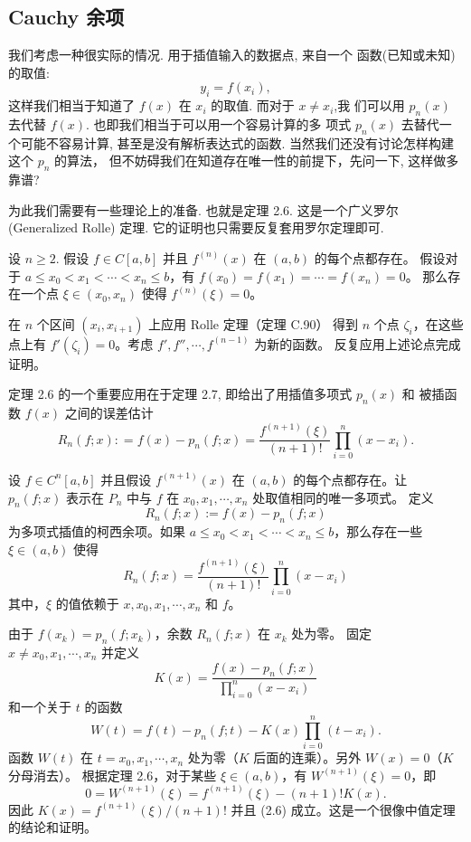 \documentclass[a4paper]{ctexart}
\newcommand{\remark}[1]
{\noindent {\bf Remark {#1}}}
\begin{document}
\subsection{Cauchy 余项}
\remark{2.4} 我们考虑一种很实际的情况. 用于插值输入的数据点, 来自一个
函数(已知或未知)的取值:
$$
y_i = f(x_i),
$$
这样我们相当于知道了 $f(x)$ 在 $x_i$ 的取值. 而对于 $x \neq x_i$,我
们可以用 $p_n(x)$ 去代替 $f(x)$. 也即我们相当于可以用一个容易计算的多
项式 $p_n(x)$ 去替代一个可能不容易计算, 甚至是没有解析表达式的函数. 
当然我们还没有讨论怎样构建这个 $p_n$ 的算法，
但不妨碍我们在知道存在唯一性的前提下，先问一下, 这样做多靠谱?

为此我们需要有一些理论上的准备. 也就是定理 2.6. 这是一个广义罗尔
(Generalized Rolle) 定理. 它的证明也只需要反复套用罗尔定理即可.

 设 $n \geq 2$. 
假设 $f \in C [a, b]$ 并且 $f^{(n)} (x)$ 在 $(a, b)$ 的每个点都存在。
假设对于 $a \leq x_0 < x_1 < \cdots < x_n \leq b$，有 $f (x_0) = f (x_1 ) = \cdots = f (x_n ) = 0$。
那么存在一个点 $\xi \in (x_0, x_n )$ 使得 $f^{(n)} (\xi) = 0$。

 在 $n$ 个区间 $(x_i , x_{i+1} )$ 上应用 Rolle 定理（定理 C.90）
得到 $n$ 个点 $\zeta_i$，在这些点上有 $f' (\zeta_i ) = 0$。考虑 $f' , f'' , \cdots , f^{(n-1)}$ 为新的函数。
反复应用上述论点完成证明。

定理 2.6 的一个重要应用在于定理 2.7, 即给出了用插值多项式 $p_n(x)$ 和
被插函数 $f(x)$ 之间的误差估计
$$
R_n(f; x) : = f(x) - p_n(f; x)
= \frac{f^{(n + 1)}(\xi)}{(n + 1)!} \prod_{i = 0}^n (x - x_i).
$$

 设 $f \in C^{n} [a, b]$ 并且假设 $f^{(n+1)} (x)$ 
在 $(a, b)$ 的每个点都存在。让 $p_n (f ; x)$ 表示在 $P_n$ 中与 $f$ 在 $x_0 , x_1 , \cdots , x_n$ 处取值相同的唯一多项式。
定义
\[
R_n (f ; x) := f (x) - p_n(f ; x) \tag{2.5}
\]
为多项式插值的柯西余项。如果 $a \leq x_0 < x_1 < \cdots < x_n \leq b$，那么存在一些 $\xi \in (a, b)$ 使得
\[
R_n (f ; x) = \frac{f^{(n+1)}(\xi)}{(n + 1)!} \prod_{i=0}^{n} (x - x_i) \tag{2.6}
\]
其中，$\xi$ 的值依赖于 $x, x_0 , x_1 , \cdots , x_n$ 和 $f$。

 由于 $f (x_k ) = p_n (f ; x_k )$，余数 $R_n (f ; x)$ 在 $x_k$ 处为零。
固定 $x \neq x_0, x_1 , \cdots , x_n$ 并定义
\[
K(x) = \frac{f (x) - p_n (f ; x)}{\prod_{i=0}^{n} (x - x_i)}
\]
和一个关于 $t$ 的函数
\[
W (t) = f (t) - p_n (f ; t) - K(x) \prod_{i=0}^{n} (t - x_i).
\]
函数 $W (t)$ 在 $t = x_0, x_1, \cdots , x_n$ 处为零（$K$ 后面的连乘）。另外 $W (x) = 0$（$K$ 分母消去）。
根据定理 2.6，对于某些 $\xi \in (a, b)$，有 $W^{(n+1)} (\xi) = 0$，即
\[
0 = W^{(n+1)} (\xi) = f^{(n+1)}(\xi) - (n + 1)!K(x).
\]
因此 $K(x) = f^{(n+1)} (\xi)/(n + 1)!$ 并且 (2.6) 成立。这是一个很像中值定理的结论和证明。
\end{document}
